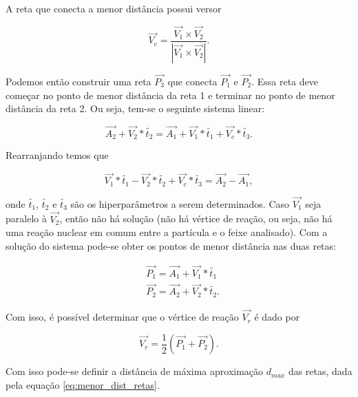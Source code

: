 \documentclass[a4paper,12pt,oneside]{book}
\begin{document}
\par A reta que conecta a menor distância possui versor

\begin{equation}\label{eq:versor_menor_dist}
    \vec{V_c} = \frac{\vec{V_1} \times \vec{V_2}}{\left | \vec{V_1} \times \vec{V_2} \right |}.
\end{equation}

Podemos então construir uma reta $\vec{P_3}$ que conecta $\vec{P_1}$ e $\vec{P_2}$. Essa reta deve começar no ponto de menor distância da reta 1 e terminar no ponto de menor distância da reta 2. Ou seja, tem-se o seguinte sistema linear:

\begin{equation*}
    \vec{A_2} + \vec{V_2} * \tilde{t_2} = \vec{A_1} + \vec{V_1} * \tilde{t_1} + \vec{V_c} * \tilde{t_3}.
\end{equation*}

Rearranjando temos que

\begin{equation}\label{eq:sistema_vertice}
    \vec{V_1} * \tilde{t_1} - \vec{V_2} * \tilde{t_2} + \vec{V_c} * \tilde{t_3} = \vec{A_2} - \vec{A_1},
\end{equation}

onde $\tilde{t_1}$, $\tilde{t_2}$ e $\tilde{t_3}$ são os hiperparâmetros a serem determinados. Caso $\vec{V_1}$ seja paralelo à $\vec{V_2}$, então não há solução (não há vértice de reação, ou seja, não há uma reação nuclear em comum entre a partícula e o feixe analisado). Com a solução do sistema pode-se obter os pontos de menor distância nas duas retas:

\begin{equation}
\begin{split}
        &\vec{P_1} = \vec{A_1} + \vec{V_1} * \tilde{t_1} \\
        &\vec{P_2} = \vec{A_2} + \vec{V_2} * \tilde{t_2}.
\end{split}
\end{equation}

\par Com isso, é possível determinar que o vértice de reação $\vec{V_r}$ é dado por

\begin{equation} \label{eq:vertice_reacao}
    \vec{V_r} = \frac{1}{2}(\vec{P_1} + \vec{P_2}).
\end{equation}

\par Com isso pode-se definir a distância de máxima aproximação $d_{max}$ das retas, dada pela equação \ref{eq:menor_dist_retas}.
\end{document}
